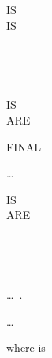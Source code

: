 \begin{syntax}
   \reportname

  \begin{0-1}
    IS  \\

     IS
    \begin{1=}
      \identifier \\
      \literal
    \end{1=} \\

    \begin{1=}
       IS \\
       ARE
    \end{1=}
    FINAL
    \begin{1=}
      \identifier
    \end{1=}\ldots \\

    \begin{0-1}
       IS \\
       ARE
    \end{0-1}
    \integer
    \begin{0-1}
       \\
    \end{0-1}
    \begin{0-1}
      \integer
      \begin{1=}
         \\
      \end{1=}
    \end{0-1}
  \end{0-1}\ldots\ {}.\newline

  \begin{1=}
  \end{1=}\ldots
\end{syntax}

where  is

